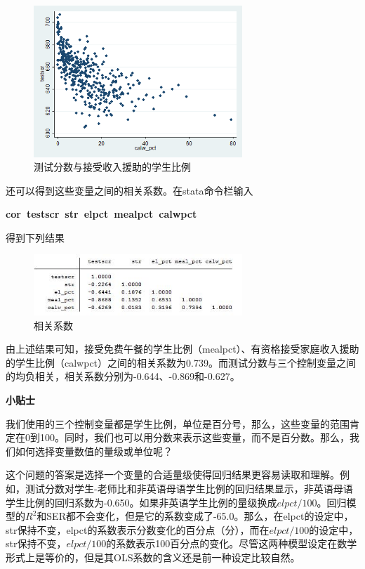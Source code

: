 \documentclass[cn,12pt,math=newtx,citestyle=gb7714-2015,bibstyle=gb7714-2015]{elegantbook}
\begin{document}
	\begin{figure}[htbp]
		\centering
		\includegraphics[width=0.7\textwidth]{income.png}
		\caption{测试分数与接受收入援助的学生比例}\label{fig:digit}
	\end{figure}
	
	还可以得到这些变量之间的相关系数。在stata命令栏输入
	
	\textbf{ cor~testscr~str~elpct~mealpct~calwpct}
	
	得到下列结果
	\begin{figure}[htbp]
		\centering
		\includegraphics[width=0.7\textwidth]{corr.jpg}
		\caption{相关系数}\label{fig:digit}
	\end{figure}
	
	由上述结果可知，接受免费午餐的学生比例（mealpct）、有资格接受家庭收入援助的学生比例（calwpct）之间的相关系数为0.739。而测试分数与三个控制变量之间的均负相关，相关系数分别为-0.644、-0.869和-0.627。
	
	\textbf{小贴士}
	
	我们使用的三个控制变量都是学生比例，单位是百分号，那么，这些变量的范围肯定在0到100。同时，我们也可以用分数来表示这些变量，而不是百分数。那么，我们如何选择变量数值的量级或单位呢？
	
	这个问题的答案是选择一个变量的合适量级使得回归结果更容易读取和理解。例如，测试分数对学生-老师比和非英语母语学生比例的回归结果显示，非英语母语学生比例的回归系数为-0.650。如果非英语学生比例的量级换成$elpct/100$。回归模型的$R^2$和SER都不会变化，但是它的系数变成了-65.0。那么，在elpct的设定中，str保持不变，elpct的系数表示分数变化的百分点（分），而在$elpct/100$的设定中，str保持不变，$elpct/100$的系数表示100百分点的变化。尽管这两种模型设定在数学形式上是等价的，但是其OLS系数的含义还是前一种设定比较自然。
	
\end{document}
